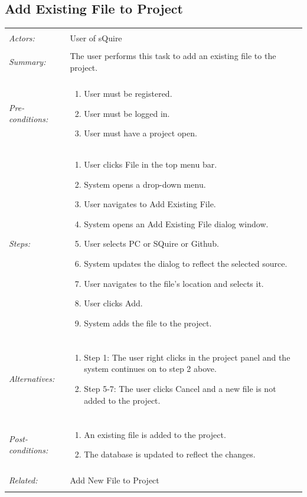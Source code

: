 \documentclass[11pt]{report}
\begin{document}
\subsection{Add Existing File to Project}
\begin{tabular}{ p{2cm} p{12cm} }
\hline
 \\
 \textit{Actors:} & User of sQuire \\
	\\
	\textit{Summary:} & The user performs this task to add an existing file to the project. \\ 
	\\
	\textit{Pre-conditions:} & \begin{enumerate}
		\item User must be registered.
		\item User must be logged in.
		\item User must have a project open.
	\end{enumerate} \\
	\textit{Steps:} & \begin{enumerate}
		\item User clicks File in the top menu bar.
		\item System opens a drop-down menu.
		\item User navigates to Add Existing File.
		\item System opens an Add Existing File dialog window.
		\item User selects PC or SQuire or Github.
		\item System updates the dialog to reflect the selected source.
		\item User navigates to the file's location and selects it.
		\item User clicks Add.
		\item System adds the file to the project.
	\end{enumerate} \\
	\\
	\textit{Alternatives:} & \begin{enumerate}
		\item Step 1: The user right clicks in the project panel and the system continues on to step 2 above.
		\item Step 5-7: The user clicks Cancel and a new file is not added to the project.
	\end{enumerate} \\
	\\
	\textit{Post-conditions:} & \begin{enumerate}
		\item An existing file is added to the project.
		\item The database is updated to reflect the changes.
	\end{enumerate} \\
	\\
	\textit{Related:} & Add New File to Project \\
	\\
	\hline
\end{tabular}
\newpage
\end{document}
